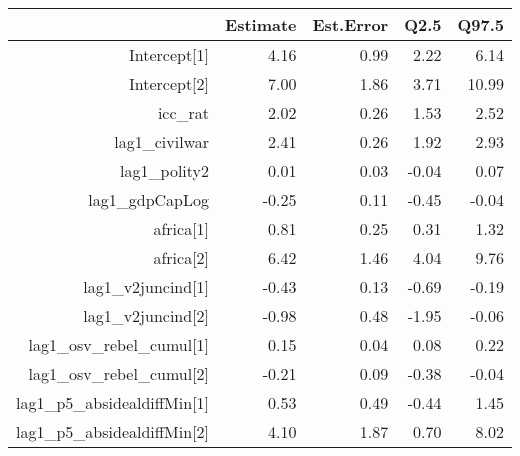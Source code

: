 \begin{table}[ht]
\centering
\begin{tabular}{rrrrr}
  \hline
 & Estimate & Est.Error & Q2.5 & Q97.5 \\ 
  \hline
Intercept[1] & 4.16 & 0.99 & 2.22 & 6.14 \\ 
  Intercept[2] & 7.00 & 1.86 & 3.71 & 10.99 \\ 
  icc\_rat & 2.02 & 0.26 & 1.53 & 2.52 \\ 
  lag1\_civilwar & 2.41 & 0.26 & 1.92 & 2.93 \\ 
  lag1\_polity2 & 0.01 & 0.03 & -0.04 & 0.07 \\ 
  lag1\_gdpCapLog & -0.25 & 0.11 & -0.45 & -0.04 \\ 
  africa[1] & 0.81 & 0.25 & 0.31 & 1.32 \\ 
  africa[2] & 6.42 & 1.46 & 4.04 & 9.76 \\ 
  lag1\_v2juncind[1] & -0.43 & 0.13 & -0.69 & -0.19 \\ 
  lag1\_v2juncind[2] & -0.98 & 0.48 & -1.95 & -0.06 \\ 
  lag1\_osv\_rebel\_cumul[1] & 0.15 & 0.04 & 0.08 & 0.22 \\ 
  lag1\_osv\_rebel\_cumul[2] & -0.21 & 0.09 & -0.38 & -0.04 \\ 
  lag1\_p5\_absidealdiffMin[1] & 0.53 & 0.49 & -0.44 & 1.45 \\ 
  lag1\_p5\_absidealdiffMin[2] & 4.10 & 1.87 & 0.70 & 8.02 \\ 
   \hline
\end{tabular}
\end{table}
